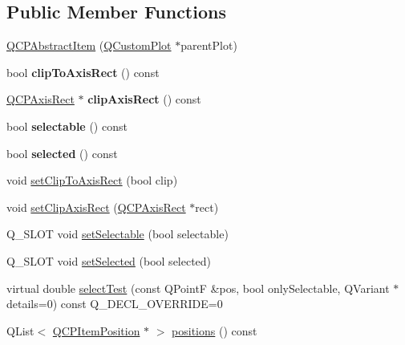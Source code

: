 \subsection*{Public Member Functions}
\begin{DoxyCompactItemize}
\item 
\mbox{\hyperlink{class_q_c_p_abstract_item_a9922507d8b4503a1fe1ed0b1030e23b6}{Q\+C\+P\+Abstract\+Item}} (\mbox{\hyperlink{class_q_custom_plot}{Q\+Custom\+Plot}} $\ast$parent\+Plot)
\item 
\mbox{\label{class_q_c_p_abstract_item_a42715ad5f3d7fca6854025fa5636f436}} 
bool {\bfseries clip\+To\+Axis\+Rect} () const
\item 
\mbox{\label{class_q_c_p_abstract_item_ae162314efd3fe1a6d4df11da1d275d52}} 
\mbox{\hyperlink{class_q_c_p_axis_rect}{Q\+C\+P\+Axis\+Rect}} $\ast$ {\bfseries clip\+Axis\+Rect} () const
\item 
\mbox{\label{class_q_c_p_abstract_item_ae29aa489767352b40c4aaa7ea50c5582}} 
bool {\bfseries selectable} () const
\item 
\mbox{\label{class_q_c_p_abstract_item_aa069fba320a13639f119f82ad29ead96}} 
bool {\bfseries selected} () const
\item 
void \mbox{\hyperlink{class_q_c_p_abstract_item_a39e05b9d4176b9accafc746d16ca6a06}{set\+Clip\+To\+Axis\+Rect}} (bool clip)
\item 
void \mbox{\hyperlink{class_q_c_p_abstract_item_a7dc75fcbcd10206fe0b75d757ea7a347}{set\+Clip\+Axis\+Rect}} (\mbox{\hyperlink{class_q_c_p_axis_rect}{Q\+C\+P\+Axis\+Rect}} $\ast$rect)
\item 
Q\+\_\+\+S\+L\+OT void \mbox{\hyperlink{class_q_c_p_abstract_item_a8a8e32a55bc478b849756a78c2d87fd2}{set\+Selectable}} (bool selectable)
\item 
Q\+\_\+\+S\+L\+OT void \mbox{\hyperlink{class_q_c_p_abstract_item_a203de94ad586cc44d16c9565f49d3378}{set\+Selected}} (bool selected)
\item 
virtual double \mbox{\hyperlink{class_q_c_p_abstract_item_ae41d0349d68bb802c49104afd100ba2a}{select\+Test}} (const Q\+PointF \&pos, bool only\+Selectable, Q\+Variant $\ast$details=0) const Q\+\_\+\+D\+E\+C\+L\+\_\+\+O\+V\+E\+R\+R\+I\+DE=0
\item 
Q\+List$<$ \mbox{\hyperlink{class_q_c_p_item_position}{Q\+C\+P\+Item\+Position}} $\ast$ $>$ \mbox{\hyperlink{class_q_c_p_abstract_item_a709f655ac3f7f22d452714134662b454}{positions}} () const

\end{DoxyCompactItemize}
